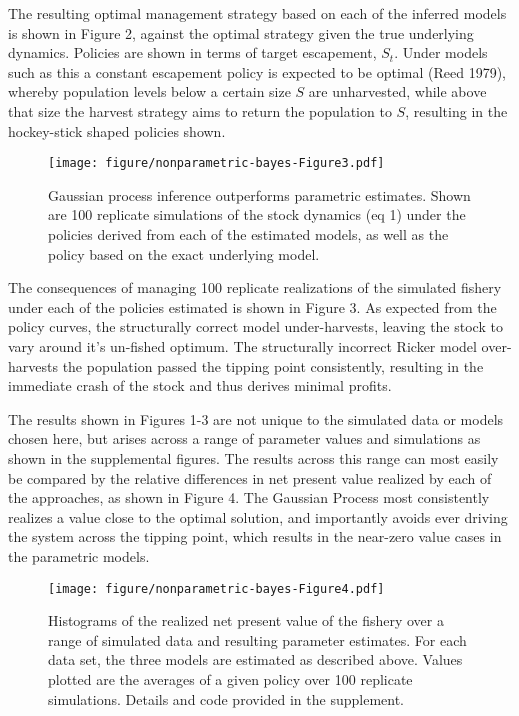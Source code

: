 \documentclass[author-year, review]{elsarticle} %
\makeatletter
\def\maxwidth{\ifdim\Gin@nat@width>\linewidth\linewidth
\else\Gin@nat@width\fi}
\let\Oldincludegraphics\includegraphics
\renewcommand{\includegraphics}[1]{\Oldincludegraphics[width=\maxwidth]{#1}}
\makeatother
\begin{document}
The resulting optimal management strategy based on each of the inferred
models is shown in Figure 2, against the optimal strategy given the true
underlying dynamics. Policies are shown in terms of target escapement,
$S_t$. Under models such as this a constant escapement policy is
expected to be optimal (Reed 1979), whereby population levels below a
certain size $S$ are unharvested, while above that size the harvest
strategy aims to return the population to $S$, resulting in the
hockey-stick shaped policies shown.

\begin{figure}[htbp]
\centering
\texttt{[image: figure/nonparametric-bayes-Figure3.pdf]}
\caption{Gaussian process inference outperforms parametric estimates.
Shown are 100 replicate simulations of the stock dynamics (eq 1) under
the policies derived from each of the estimated models, as well as the
policy based on the exact underlying model.}
\end{figure}

The consequences of managing 100 replicate realizations of the simulated
fishery under each of the policies estimated is shown in Figure 3. As
expected from the policy curves, the structurally correct model
under-harvests, leaving the stock to vary around it's un-fished optimum.
The structurally incorrect Ricker model over-harvests the population
passed the tipping point consistently, resulting in the immediate crash
of the stock and thus derives minimal profits.

The results shown in Figures 1-3 are not unique to the simulated data or
models chosen here, but arises across a range of parameter values and
simulations as shown in the supplemental figures. The results across
this range can most easily be compared by the relative differences in
net present value realized by each of the approaches, as shown in Figure
4. The Gaussian Process most consistently realizes a value close to the
optimal solution, and importantly avoids ever driving the system across
the tipping point, which results in the near-zero value cases in the
parametric models.

\begin{figure}[htbp]
\centering
\texttt{[image: figure/nonparametric-bayes-Figure4.pdf]}
\caption{Histograms of the realized net present value of the fishery
over a range of simulated data and resulting parameter estimates. For
each data set, the three models are estimated as described above. Values
plotted are the averages of a given policy over 100 replicate
simulations. Details and code provided in the supplement.}
\end{figure}
\end{document}
